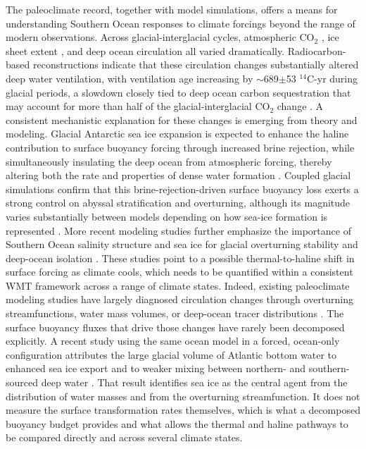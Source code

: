 \documentclass[pdflatex,sn-nature]{sn-jnl}
\begin{document}
The paleoclimate record, together with model simulations, offers a means for understanding Southern Ocean responses to climate forcings beyond the range of modern observations. Across glacial-interglacial cycles, atmospheric CO$_2$ \cite{SigmanBoyle2000,Kohfeld2005}, ice sheet extent \cite{huybrechts1990antarctic}, and deep ocean circulation \cite{rafter2022global} all varied dramatically. Radiocarbon-based reconstructions indicate that these circulation changes substantially altered deep water ventilation, with ventilation age increasing by $\sim$689$\pm$53 $^{14}$C-yr during glacial periods, a slowdown closely tied to deep ocean carbon sequestration that may account for more than half of the glacial-interglacial CO$_2$ change \cite{Skinner2017}. A consistent mechanistic explanation for these changes is emerging from theory and modeling. Glacial Antarctic sea ice expansion is expected to enhance the haline contribution to surface buoyancy forcing through increased brine rejection, while simultaneously insulating the deep ocean from atmospheric forcing, thereby altering both the rate and properties of dense water formation \cite{Ferrari2014}. Coupled glacial simulations confirm that this brine-rejection-driven surface buoyancy loss exerts a strong control on abyssal stratification and overturning, although its magnitude varies substantially between models depending on how sea-ice formation is represented \cite{Marzocchi2017}. More recent modeling studies further emphasize the importance of Southern Ocean salinity structure and sea ice for glacial overturning stability and deep-ocean isolation \cite{knorr2021salty}. These studies point to a possible thermal-to-haline shift in surface forcing as climate cools, which needs to be quantified within a consistent WMT framework across a range of climate states. Indeed, existing paleoclimate modeling studies have largely diagnosed circulation changes through overturning streamfunctions, water mass volumes, or deep-ocean tracer distributions \cite{Weber2007,Wainer2012}. The surface buoyancy fluxes that drive those changes have rarely been decomposed explicitly. A recent study using the same ocean model in a forced, ocean-only configuration attributes the large glacial volume of Atlantic bottom water to enhanced sea ice export and to weaker mixing between northern- and southern-sourced deep water \cite{Chen2025}. That result identifies sea ice as the central agent from the distribution of water masses and from the overturning streamfunction. It does not measure the surface transformation rates themselves, which is what a decomposed buoyancy budget provides and what allows the thermal and haline pathways to be compared directly and across several climate states.
\end{document}
